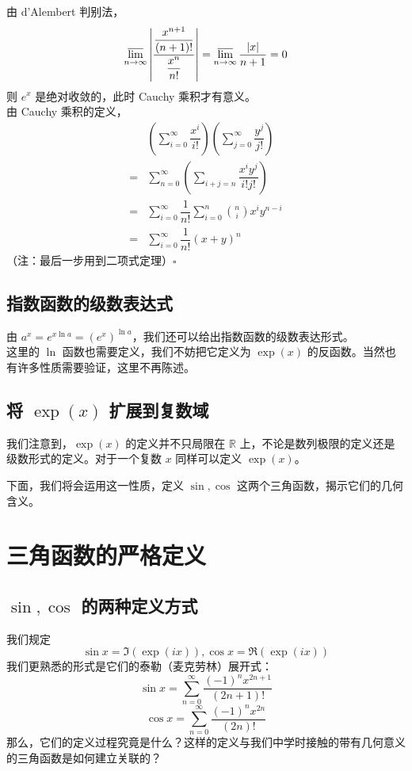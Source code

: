 \documentclass[UTF8,12pt]{ctexart}
\begin{document}
            由 d'Alembert 判别法，$$
            \varlimsup_{n \to \infty} \left| \dfrac{\dfrac{x^{n + 1}}{(n + 1)!}}{\dfrac{x^n}{n!}}\right| = \varlimsup_{n \to \infty} \dfrac{|x|}{n + 1} = 0
            $$
            则 $e^x$ 是绝对收敛的，此时 Cauchy 乘积才有意义。\\
            由 Cauchy 乘积的定义，
            $$
            \begin{aligned}
            & (\sum_{i = 0}^{\infty}\dfrac{x^i}{i!})(\sum_{j = 0}^{\infty}\dfrac{y^j}{j!})\\
            =& \sum_{n = 0}^{\infty}(\sum_{i + j = n}\dfrac{x^i y^j}{i! j!})\\
            =& \sum_{i = 0}^{\infty}\dfrac{1}{n!}\sum_{i = 0}^{n}\binom{n}{i}x^i y^{n - i}\\
            =& \sum_{i = 0}^{\infty}\dfrac 1 {n!}(x + y)^n
            \end{aligned}
            $$
            （注：最后一步用到二项式定理）$\square$

    \subsection{指数函数的级数表达式}
        由 $a^x = e^{x\ln a} = (e^x)^{\ln a}$，我们还可以给出指数函数的级数表达形式。\\
        这里的 $\ln$ 函数也需要定义，我们不妨把它定义为 $\exp(x)$ 的反函数。当然也有许多性质需要验证，这里不再陈述。
    \subsection{将 $\exp(x)$ 扩展到复数域}
        我们注意到，$\exp(x)$ 的定义并不只局限在 $\mathbb R$ 上，不论是数列极限的定义还是级数形式的定义。对于一个复数 $x$ 同样可以定义 $\exp(x)$。

        下面，我们将会运用这一性质，定义 $\sin, \cos$ 这两个三角函数，揭示它们的几何含义。
\section{三角函数的严格定义}
    \subsection{$\sin, \cos$ 的两种定义方式}
        我们规定
        $$
        \sin x = \Im(\exp(ix)), \cos x = \Re(\exp(ix))
        $$
        我们更熟悉的形式是它们的泰勒（麦克劳林）展开式：
        $$
        \sin x = \sum_{n = 0}^{\infty} \dfrac{(-1)^{n} x^{2n + 1}}{(2n + 1)!}
        $$
        $$
        \cos x = \sum_{n = 0}^{\infty} \dfrac{(-1)^{n} x^{2n}}{(2n)!}
        $$
        那么，它们的定义过程究竟是什么？这样的定义与我们中学时接触的带有几何意义的三角函数是如何建立关联的？
\end{document}
